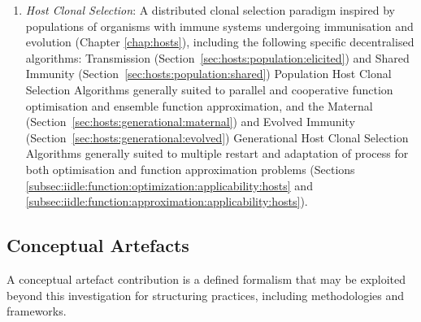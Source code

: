 \begin{enumerate}
	\item \emph{Host Clonal Selection}: A distributed clonal selection paradigm inspired by populations of organisms with immune systems undergoing immunisation and evolution (Chapter \ref{chap:hosts}), including the following specific decentralised algorithms: Transmission (Section~\ref{sec:hosts:population:elicited}) and Shared Immunity (Section~\ref{sec:hosts:population:shared}) Population Host Clonal Selection Algorithms generally suited to parallel and cooperative function optimisation and ensemble function approximation, and the Maternal (Section~\ref{sec:hosts:generational:maternal}) and Evolved Immunity (Section~\ref{sec:hosts:generational:evolved}) Generational Host Clonal Selection Algorithms generally suited to multiple restart and adaptation of process for both optimisation and function approximation problems (Sections \ref{subsec:iidle:function:optimization:applicability:hosts} and \ref{subsec:iidle:function:approximation:applicability:hosts}). 
	
\end{enumerate}


%
% 
\subsection{Conceptual Artefacts}
A conceptual artefact contribution is a defined formalism that may be exploited beyond this investigation for structuring practices, including methodologies and frameworks.

